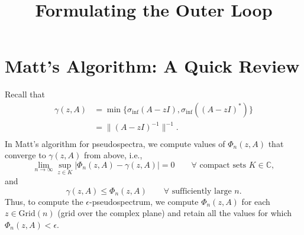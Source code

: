 \documentclass[12pt,a4paper]{article}
\title{Formulating the Outer Loop}
\author{}
\date{}
\theoremstyle{boldthm}
\theoremstyle{bolddefn}
\begin{document}
\maketitle

\section{Matt's Algorithm: A Quick Review}

Recall that 
\begin{equation}
\begin{aligned}
    \gamma(z, A) &= \min \{ \sigma_{\text{inf}}(A-zI), \sigma_{\text{inf}}((A-zI)^*) \} \\
    &= \| (A-zI)^{-1} \|^{-1}.\\
\end{aligned}
\end{equation}
In Matt's algorithm for pseudospectra, we compute values of $\Phi_n(z, A)$ that converge to $\gamma(z, A)$ from above, i.e., 
\begin{equation} \label{lim}
    \lim_{n\rightarrow \infty} \sup_{z \in K} | \Phi_n(z, A) - \gamma(z, A) | = 0 \qquad \forall \text{ compact sets } K \in \mathbb{C},
\end{equation}
and
\begin{equation} \label{above}
    \gamma(z, A) \le \Phi_n(z, A) \qquad \forall \text{ sufficiently large } n.
\end{equation}
Thus, to compute the $\epsilon$-pseudospectrum, we compute $\Phi_n(z, A)$ for each $z \in \text{Grid}(n)$ (grid over the complex plane) and retain all the values for which $\Phi_n(z, A) < \epsilon.$
\end{document}
